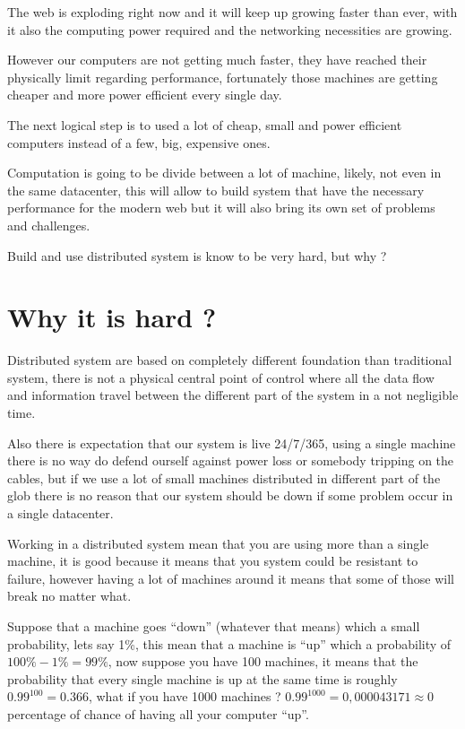 \documentclass[12pt]{article} %
\begin{document}
The web is exploding right now and it will keep up growing faster than ever, with it also the computing power required and the networking necessities are growing.

However our computers are not getting much faster, they have reached their physically limit regarding performance, fortunately those machines are getting cheaper and more power efficient every single day.

The next logical step is to used a lot of cheap, small and power efficient computers instead of a few, big, expensive ones.

Computation is going to be divide between a lot of machine, likely, not even in the same datacenter, this will allow to build system that have the necessary performance for the modern web but it will also bring its own set of problems and challenges.

Build and use distributed system is know to be very hard, but why ?

\section{Why it is hard ?}

Distributed system are based on completely different foundation than traditional system, there is not a physical central point of control where all the data flow and information travel between the different part of the system in a not negligible time.

Also there is expectation that our system is live 24/7/365, using a single machine there is no way do defend ourself against power loss or somebody tripping on the cables, but if we use a lot of small machines distributed in different part of the glob there is no reason that our system should be down if some problem occur in a single datacenter.

Working in a distributed system mean that you are using more than a single machine, it is good because it means that you system could be resistant to failure, however having a lot of machines around it means that some of those will break no matter what.

Suppose that a machine goes ``down'' (whatever that means) which a small probability, lets say 1\%, this mean that a machine is ``up'' which a probability of $ 100\%-1\% = 99\%$, now suppose you have 100 machines, it means that the probability that every single machine is up at the same time is roughly $ 0.99^{100} = 0.366 $, what if you have 1000 machines ? $0.99 ^ {1000} = 0,000043171 \approx 0$ percentage of chance of having all your computer ``up''.
\end{document}
